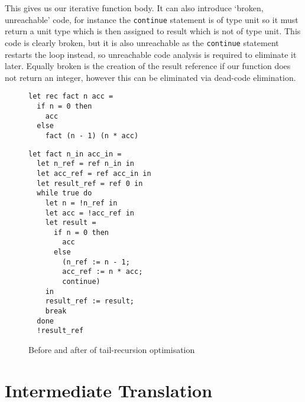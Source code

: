 \documentclass[12pt,twoside,notitlepage]{report}
\newcommand{\camlinline}{\texttt}
\newcommand{\cfbox}[2]{%
	\colorlet{currentcolor}{.}%
	{\color{#1}%
		\fbox{\color{currentcolor}#2}}%
}
\newcommand\note[1]{\noindent\cfbox{blue}{\parbox{\textwidth}{\textcolor{blue}{#1}}}}
\begin{document}
This gives us our iterative function body. It can also introduce `broken, unreachable' code, for instance the \camlinline{continue} statement is of type unit so it must return a unit type which is then assigned to result which is not of type unit. This code is clearly broken, but it is also unreachable as the \camlinline{continue} statement restarts the loop instead, so unreachable code analysis is required to eliminate it later. Equally broken is the creation of the result reference if our function does not return an integer, however this can be eliminated via dead-code elimination.

\begin{figure}[h]
\begin{minipage}{0.5\linewidth}
	\begin{verbatim}
let rec fact n acc =
  if n = 0 then
    acc
  else
    fact (n - 1) (n * acc)
	\end{verbatim}
\end{minipage}
\begin{minipage}{0.5\linewidth}
\begin{verbatim}
let fact n_in acc_in =
  let n_ref = ref n_in in
  let acc_ref = ref acc_in in
  let result_ref = ref 0 in
  while true do
    let n = !n_ref in
    let acc = !acc_ref in
    let result =
      if n = 0 then
        acc
      else
        (n_ref := n - 1;
        acc_ref := n * acc;
        continue)
    in
    result_ref := result;
    break
  done
  !result_ref
\end{verbatim}
\end{minipage}
	\caption{Before and after of tail-recursion optimisation}
	\label{fig:tailrec}
\end{figure}





\section{Intermediate Translation}
\end{document}
